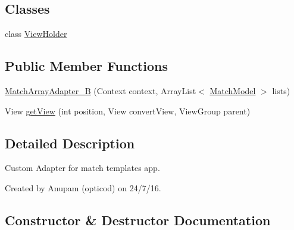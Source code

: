 \subsection*{Classes}
\begin{DoxyCompactItemize}
\item 
class \hyperlink{classorg_1_1buildmlearn_1_1matchtemplate_1_1adapter_1_1MatchArrayAdapter__B_1_1ViewHolder}{View\+Holder}
\end{DoxyCompactItemize}
\subsection*{Public Member Functions}
\begin{DoxyCompactItemize}
\item 
\hyperlink{classorg_1_1buildmlearn_1_1matchtemplate_1_1adapter_1_1MatchArrayAdapter__B_ac0b44af1aeb1cd0609671ca62fd92884}{Match\+Array\+Adapter\+\_\+B} (Context context, Array\+List$<$ \hyperlink{classorg_1_1buildmlearn_1_1matchtemplate_1_1data_1_1MatchModel}{Match\+Model} $>$ lists)
\item 
View \hyperlink{classorg_1_1buildmlearn_1_1matchtemplate_1_1adapter_1_1MatchArrayAdapter__B_a91f59dd98cca741606ecc2e3030fc0de}{get\+View} (int position, View convert\+View, View\+Group parent)
\end{DoxyCompactItemize}


\subsection{Detailed Description}
Custom Adapter for match template\textquotesingle{}s app. 

Created by Anupam (opticod) on 24/7/16. 

\subsection{Constructor \& Destructor Documentation}
